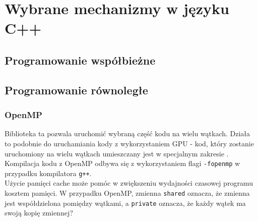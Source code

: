 \chapter{Wybrane mechanizmy w języku C++}
\section{Programowanie współbieżne}


\section{Programowanie równoległe}

\subsection{OpenMP}
Biblioteka ta pozwala uruchomić wybraną część kodu na wielu wątkach. Działa to podobnie do uruchamiania kody z wykorzystaniem GPU - kod, który zostanie uruchomiony na wielu wątkach umieszczany jest w specjalnym zakresie . 
Kompilacja kodu z OpenMP odbywa się z wykorzystaniem flagi \texttt{-fopenmp} w przypadku kompilatora \texttt{g++}.\\
Użycie pamięci cache może pomóc w zwiększeniu wydajności czasowej programu kosztem pamięci. W przypadku OpenMP, zmienna \texttt{shared} oznacza, że zmienna jest współdzielona pomiędzy wątkami, a \texttt{private} oznacza, że każdy wątek ma swoją kopię zmiennej?\\